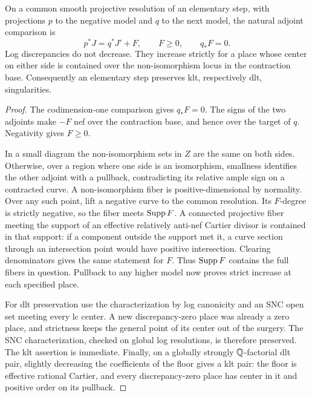 \begin{lemma}
\label{bir:comparison}
On a common smooth projective resolution of an elementary step, with
projections $p$ to the negative model and $q$ to the next model, the
natural adjoint comparison is
\begin{equation}
 p^*J=q^*J'+F,\qquad F\geq0,\qquad q_*F=0.
 \label{bir:effective-comparison}
\end{equation}
Log discrepancies do not decrease.  They increase strictly for a
place whose center on either side is contained over the non-isomorphism
locus in the contraction base.  Consequently an elementary step
preserves klt, respectively dlt, singularities.
\end{lemma}

\begin{proof}
The codimension-one comparison gives $q_*F=0$.  The signs of the two
adjoints make $-F$ nef over the contraction base, and hence over the
target of $q$.  Negativity gives $F\geq0$.

In a small diagram the non-isomorphism sets in $Z$ are the same on
both sides.  Otherwise, over a region where one side is an isomorphism,
smallness identifies the other adjoint with a pullback, contradicting
its relative ample sign on a contracted curve.  A non-isomorphism
fiber is positive-dimensional by normality.  Over any such point,
lift a negative curve to the common resolution.  Its $F$-degree is
strictly negative, so the fiber meets $\operatorname{Supp} F$.  A connected
projective fiber meeting the support of an effective relatively
anti-nef Cartier divisor is contained in that support: if a component
outside the support met it, a curve section through an intersection
point would have positive intersection.  Clearing denominators gives
the same statement for $F$.  Thus $\operatorname{Supp} F$ contains the full fibers
in question.  Pullback to any higher model now proves strict increase
at each specified place.

For dlt preservation use the characterization by log canonicity and an
SNC open set meeting every lc center.  A new discrepancy-zero place
was already a zero place, and strictness keeps the general point of
its center out of the surgery.  The SNC characterization, checked on
global log resolutions, is therefore preserved.  The klt assertion is
immediate.  Finally, on a globally strongly $\mathbb{Q}$-factorial dlt pair,
slightly decreasing the coefficients of the floor gives a klt pair:
the floor is effective rational Cartier, and every discrepancy-zero
place has center in it and positive order on its pullback.
\end{proof}

